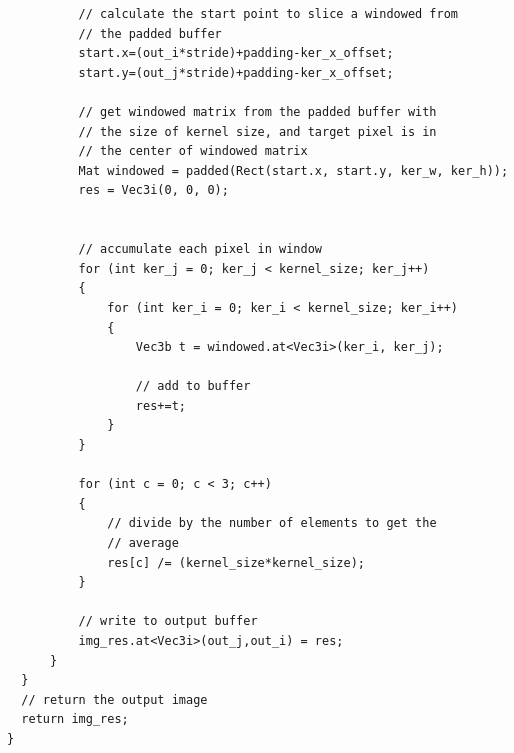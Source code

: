 \documentclass[12pt,a4paper]{report}
\begin{document}
\begin{lstlisting}
          // calculate the start point to slice a windowed from 
          // the padded buffer
          start.x=(out_i*stride)+padding-ker_x_offset;
          start.y=(out_j*stride)+padding-ker_x_offset;

          // get windowed matrix from the padded buffer with 
          // the size of kernel size, and target pixel is in
          // the center of windowed matrix
          Mat windowed = padded(Rect(start.x, start.y, ker_w, ker_h));
          res = Vec3i(0, 0, 0);


          // accumulate each pixel in window
          for (int ker_j = 0; ker_j < kernel_size; ker_j++)
          {
              for (int ker_i = 0; ker_i < kernel_size; ker_i++)
              {
                  Vec3b t = windowed.at<Vec3i>(ker_i, ker_j);
                  
                  // add to buffer
                  res+=t;
              }
          }

          for (int c = 0; c < 3; c++)
          {
              // divide by the number of elements to get the 
              // average
              res[c] /= (kernel_size*kernel_size);
          }

          // write to output buffer
          img_res.at<Vec3i>(out_j,out_i) = res;
      }
  }
  // return the output image
  return img_res;
}
\end{lstlisting}
\end{document}
